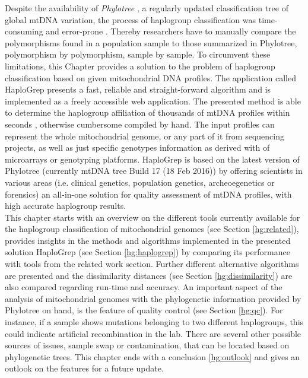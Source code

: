 Despite the availability of \textit{Phylotree} \cite{VanOven2009}, a regularly updated classification tree of global mtDNA variation, the process of haplogroup classification was time-consuming and error-prone \cite{Kloss-Brandstatter2011}. Thereby researchers have to manually compare the polymorphisms found in a population sample to those summarized in Phylotree, polymorphism by polymorphism, sample by sample. To circumvent these limitations, this Chapter provides a solution to the problem of haplogroup classification based on given mitochondrial DNA profiles. The application called HaploGrep presents a fast, reliable and straight-forward algorithm and is implemented as a freely accessible web application. The presented method is able to determine the haplogroup affiliation of thousands of mtDNA profiles within seconds \cite{Kloss-Brandstatter2011}, otherwise cumbersome compiled by hand. The input profiles can represent the whole mitochondrial genome, or any part of it from sequencing projects, as well as just specific genotypes information as derived with of microarrays or genotyping platforms. HaploGrep is based on the latest version of Phylotree (currently mtDNA tree Build 17 (18 Feb 2016)) by offering scientists in various areas (i.e. clinical genetics, population genetics, archeoegenetics or forensics) an all-in-one solution for quality assessment of mtDNA profiles, with high accurate haplogroup results. \\
This chapter starts with an overview on the different tools currently available for the haplogroup classification of mitochondrial genomes (see Section \ref{hg:related}), provides insights in the methods and algorithms implemented in the presented solution HaploGrep (see Section \ref{hg:haplogrep}) by comparing its performance with tools from the related work section. Further different alternative algorithms are presented and the dissimilarity distances (see Section \ref{hg:dissimilarity}) are also compared regarding run-time and accuracy. An important aspect of the analysis of mitochondrial genomes with the phylogenetic information provided by Phylotree on hand, is the feature of quality control (see Section \ref{hg:qc}). For instance, if a sample shows mutations belonging to two different haplogroups, this could indicate artificial recombination in the lab. There are several other possible sources of issues, sample swap or contamination, that can be located based on phylogenetic trees. This chapter ends with a conclusion \ref{hg:outlook} and gives an outlook on the features for a future update.  
